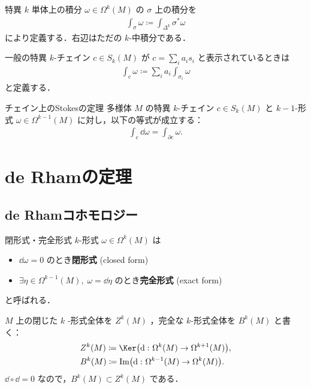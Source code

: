 \documentclass[geometry_main]{subfiles}
\begin{document}
\begin{mydef}[label=def.int_k-form_sg]{特異 $k$ 単体上の積分}
	$\omega \in \Omega^k(M)$ の $\sigma$ 上の積分を
	\begin{align} 
		\int_{\sigma} \omega \coloneqq \int_{\varDelta^k} \sigma^* \omega
	\end{align}
	により定義する．右辺はただの $k$-中積分である．

	一般の\cinfty 特異 $k$-チェイン $c \in S_k(M)$ が $c = \sum_{i} a_i s_i$ と表示されているときは
	\begin{align} 
		\int_c \omega \coloneqq \sum_i a_i \int_{\sigma_i} \omega
	\end{align}
	と定義する．
\end{mydef}


\begin{mytheo}[label=Stokes]{チェイン上のStokesの定理}
	\cinfty 多様体 $M$ の特異 $k$-チェイン $c \in S_k(M)$ と $k-1$-形式 $\omega \in \Omega^{k-1}(M)$ に対し，以下の等式が成立する：
	\begin{align} 
		\int_c \dd{\omega} = \int_{\partial c} \omega.
	\end{align}
\end{mytheo}

\section{de Rhamの定理}

\subsection{de Rhamコホモロジー}

\begin{mydef}[label=def.close]{閉形式・完全形式} 
	$k$-形式 $\omega \in \Omega^k(M)$ は
	\begin{itemize} 
		\item $\dd{\omega} = 0$ のとき\textbf{閉形式} (closed form)
		\item $\exists \eta \in \Omega^{k-1}(M),\; \omega = \dd{\eta}$ のとき\textbf{完全形式} (exact form)
	\end{itemize}
	と呼ばれる．
\end{mydef}

$M$ 上の閉じた $k$ -形式全体を $Z^k(M)$ ，完全な $k$-形式全体を $B^k(M)$ と書く：
\begin{align} 
	&Z^k(M) \coloneqq \Ker \bigl( \dd{}\colon \Omega^k(M) \to \Omega^{k+1}(M) \bigr) , \\
	&B^k(M) \coloneqq \Im \bigl( \dd{}\colon \Omega^{k-1}(M) \to \Omega^{k}(M) \bigr).
\end{align}
$\dd{}\circ \dd{} = 0$ なので，$B^k(M) \subset Z^k(M)$ である．
\end{document}
